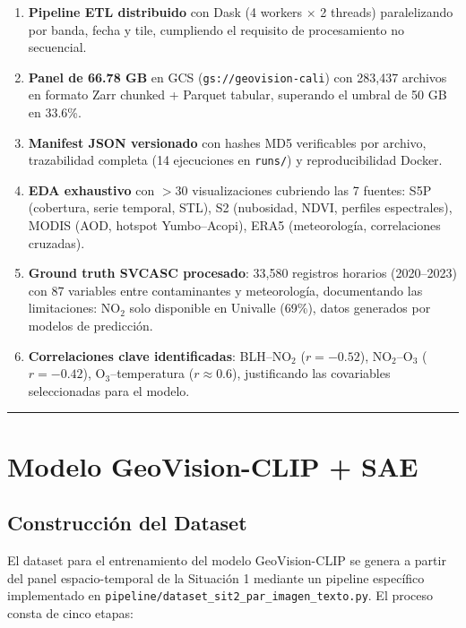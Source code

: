 \documentclass[10pt,a4paper,twocolumn]{article}
\begin{document}
\begin{enumerate}[nosep, leftmargin=*, itemsep=2pt]
  \item \textbf{Pipeline ETL distribuido} con Dask (4 workers $\times$ 2 threads) paralelizando por banda, fecha y tile, cumpliendo el requisito de procesamiento no secuencial.
  \item \textbf{Panel de 66.78 GB} en GCS (\texttt{gs://geovision-cali}) con 283,437 archivos en formato Zarr chunked + Parquet tabular, superando el umbral de 50 GB en 33.6\%.
  \item \textbf{Manifest JSON versionado} con hashes MD5 verificables por archivo, trazabilidad completa (14 ejecuciones en \texttt{runs/}) y reproducibilidad Docker.
  \item \textbf{EDA exhaustivo} con $>$30 visualizaciones cubriendo las 7 fuentes: S5P (cobertura, serie temporal, STL), S2 (nubosidad, NDVI, perfiles espectrales), MODIS (AOD, hotspot Yumbo--Acopi), ERA5 (meteorología, correlaciones cruzadas).
  \item \textbf{Ground truth SVCASC procesado}: 33,580 registros horarios (2020--2023) con 87 variables entre contaminantes y meteorología, documentando las limitaciones: NO$_2$ solo disponible en Univalle (69\%), datos generados por modelos de predicción.
  \item \textbf{Correlaciones clave identificadas}: BLH--NO$_2$ ($r = -0.52$), NO$_2$--O$_3$ ($r = -0.42$), O$_3$--temperatura ($r\approx0.6$), justificando las covariables seleccionadas para el modelo.
\end{enumerate}

\vspace{0.1cm}
\noindent\rule{\columnwidth}{0.3pt}
\vspace{0.15cm}

\section{Modelo GeoVision-CLIP + SAE}

\subsection{Construcción del Dataset}

El dataset para el entrenamiento del modelo GeoVision-CLIP se genera a partir del panel espacio-temporal de la Situación 1 mediante un pipeline específico implementado en \texttt{pipeline/dataset\_sit2\_par\_imagen\_texto.py}. El proceso consta de cinco etapas:
\end{document}
